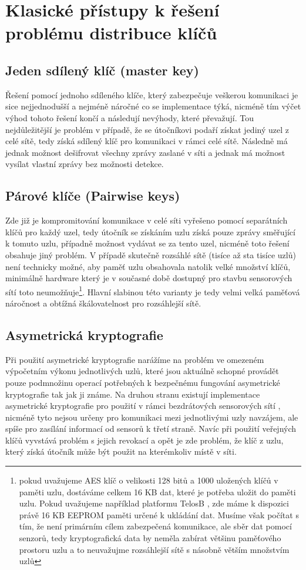 \documentclass[11pt,final,twoside]{fithesis2}
\begin{document}
\section{Klasické přístupy k řešení problému distribuce klíčů}
\subsection{Jeden sdílený klíč (master key)} Řešení pomocí jednoho sdíleného klíče, který zabezpečuje veškerou komunikaci je sice nejjednodušší a 
nejméně náročné co se implementace týká, nicméně tím výčet výhod tohoto řešení končí a následují nevýhody, které převažují. Tou nejdůležitější 
je problém v případě, že se útočníkovi podaří získat jediný uzel z celé sítě, tedy získá sdílený klíč pro komunikaci v rámci celé sítě. Následně 
má jednak možnost dešifrovat všechny zprávy zaslané v síti a jednak má možnost vysílat vlastní zprávy bez možnosti detekce.

\subsection{Párové klíče (Pairwise keys)} Zde již je kompromitování komunikace v celé síti vyřešeno pomocí separátních klíčů pro každý uzel, 
tedy útočník se získáním uzlu získá pouze zprávy směřující k tomuto uzlu, případně možnost vydávat se za tento uzel, nicméně toto řešení 
obsahuje jiný problém. V případě skutečně rozsáhlé sítě (tisíce až sta tisíce uzlů) není technicky možné, aby paměť uzlu obsahovala natolik 
velké množství klíčů, minimálně hardware který je v současné době dostupný pro stavbu sensorových sítí toto neumožňuje\footnote{pokud uvažujeme 
AES \cite{Daemen1999} klíč o velikosti 128 bitů a 1000 uložených klíčů v paměti uzlu, dostáváme celkem 16 KB dat, které je potřeba uložit do paměti uzlu. 
Pokud uvažujeme například platformu TelosB \cite{MemsicInc.}, zde máme k dispozici právě 16 KB EEPROM paměti určené k ukládání dat. Musíme však počítat s 
tím, že není primárním cílem zabezpečená komunikace, ale sběr dat pomocí senzorů, tedy kryptografická data by neměla zabírat většinu paměťového prostoru 
uzlu a to neuvažujme rozsáhlejší sítě s násobně větším množstvím uzlů}. Hlavní slabinou této varianty je tedy velmi velká paměťová náročnost a obtížná 
škálovatelnost pro rozsáhlejší sítě. 

\subsection{Asymetrická kryptografie} Při použití asymetrické kryptografie narážíme na problém ve omezeném výpočetním výkonu jednotlivých uzlů, 
které jsou aktuálně schopné provádět pouze podmnožinu operací potřebných k bezpečnému fungování asymetrické kryptografie tak jak ji známe.
Na druhou stranu existují implementace asymetrické kryptografie pro použití v rámci bezdrátových sensorových sítí \cite{Watro2004}, nicméně 
tyto nejsou určeny pro komunikaci mezi jednotlivými uzly navzájem, ale spíše pro zasílání informací od sensorů k třetí straně. 
Navíc při použití veřejných klíčů vyvstává problém s jejich revokací a opět je zde problém, že klíč z uzlu, který získá útočník může být použit 
na kterémkoliv místě v síti.
\end{document}
